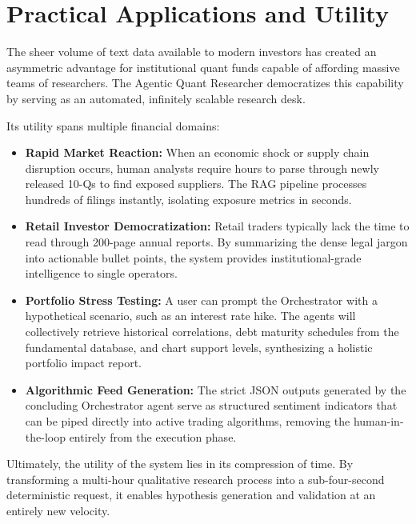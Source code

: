 \section{Practical Applications and Utility}

The sheer volume of text data available to modern investors has created an asymmetric advantage for institutional quant funds capable of affording massive teams of researchers. The Agentic Quant Researcher democratizes this capability by serving as an automated, infinitely scalable research desk.

Its utility spans multiple financial domains:
\begin{itemize}
    \item \textbf{Rapid Market Reaction:} When an economic shock or supply chain disruption occurs, human analysts require hours to parse through newly released 10-Qs to find exposed suppliers. The RAG pipeline processes hundreds of filings instantly, isolating exposure metrics in seconds.
    \item \textbf{Retail Investor Democratization:} Retail traders typically lack the time to read through 200-page annual reports. By summarizing the dense legal jargon into actionable bullet points, the system provides institutional-grade intelligence to single operators.
    \item \textbf{Portfolio Stress Testing:} A user can prompt the Orchestrator with a hypothetical scenario, such as an interest rate hike. The agents will collectively retrieve historical correlations, debt maturity schedules from the fundamental database, and chart support levels, synthesizing a holistic portfolio impact report.
    \item \textbf{Algorithmic Feed Generation:} The strict JSON outputs generated by the concluding Orchestrator agent serve as structured sentiment indicators that can be piped directly into active trading algorithms, removing the human-in-the-loop entirely from the execution phase.
\end{itemize}

Ultimately, the utility of the system lies in its compression of time. By transforming a multi-hour qualitative research process into a sub-four-second deterministic request, it enables hypothesis generation and validation at an entirely new velocity.
